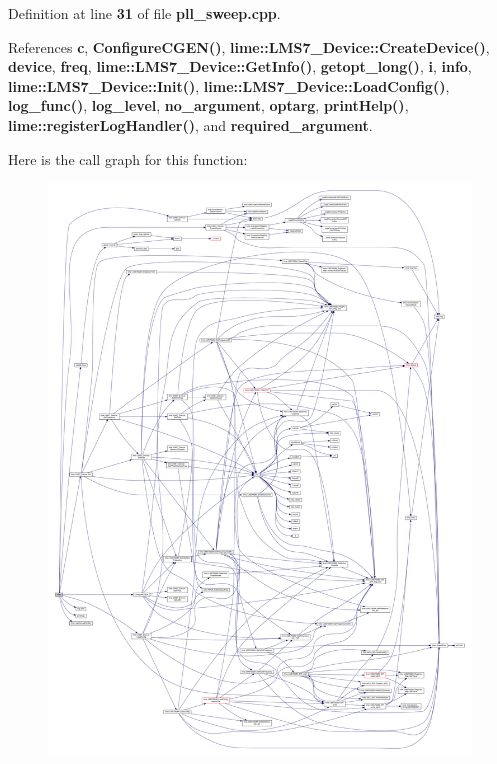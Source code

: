 Definition at line {\bf 31} of file {\bf pll\+\_\+sweep.\+cpp}.



References {\bf c}, {\bf Configure\+C\+G\+E\+N()}, {\bf lime\+::\+L\+M\+S7\+\_\+\+Device\+::\+Create\+Device()}, {\bf device}, {\bf freq}, {\bf lime\+::\+L\+M\+S7\+\_\+\+Device\+::\+Get\+Info()}, {\bf getopt\+\_\+long()}, {\bf i}, {\bf info}, {\bf lime\+::\+L\+M\+S7\+\_\+\+Device\+::\+Init()}, {\bf lime\+::\+L\+M\+S7\+\_\+\+Device\+::\+Load\+Config()}, {\bf log\+\_\+func()}, {\bf log\+\_\+level}, {\bf no\+\_\+argument}, {\bf optarg}, {\bf print\+Help()}, {\bf lime\+::register\+Log\+Handler()}, and {\bf required\+\_\+argument}.



Here is the call graph for this function\+:
\nopagebreak
\begin{figure}[H]
\begin{center}
\leavevmode
\includegraphics[width=350pt]{d4/d8f/pll__sweep_8cpp_a3c04138a5bfe5d72780bb7e82a18e627_cgraph}
\end{center}
\end{figure}


